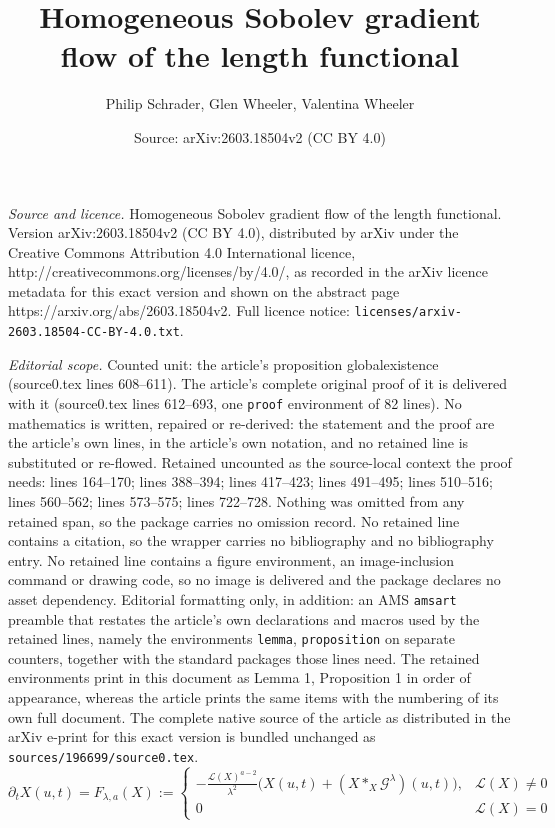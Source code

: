 \documentclass[10pt,a4paper]{amsart}
\title{Homogeneous Sobolev gradient flow of the length functional}
\author{Philip Schrader, Glen Wheeler, Valentina Wheeler}
\date{Source: arXiv:2603.18504v2 (CC BY 4.0)}
\renewcommand{\L}{\length}
\def\length{\mathcal L}
\begin{document}
\maketitle

\noindent\emph{Source and licence.} Homogeneous Sobolev gradient flow of the length functional. Version arXiv:2603.18504v2 (CC BY 4.0), distributed by arXiv under the Creative Commons Attribution 4.0 International licence, http://creativecommons.org/licenses/by/4.0/, as recorded in the arXiv licence metadata for this exact version and shown on the abstract page https://arxiv.org/abs/2603.18504v2. Full licence notice: \texttt{licenses/arxiv-2603.18504-CC-BY-4.0.txt}.\par\smallskip

\noindent\textit{Editorial scope.} Counted unit: the article's proposition globalexistence (source0.tex lines 608--611). The article's complete original proof of it is delivered with it (source0.tex lines 612--693, one \texttt{proof} environment of 82 lines). No mathematics is written, repaired or re-derived: the statement and the proof are the article's own lines, in the article's own notation, and no retained line is substituted or re-flowed.  Retained uncounted as the source-local context the proof needs: lines 164--170; lines 388--394; lines 417--423; lines 491--495; lines 510--516; lines 560--562; lines 573--575; lines 722--728.  Nothing was omitted from any retained span, so the package carries no omission record.  No retained line contains a citation, so the wrapper carries no bibliography and no bibliography entry.  No retained line contains a figure environment, an image-inclusion command or drawing code, so no image is delivered and the package declares no asset dependency.  Editorial formatting only, in addition: an AMS \texttt{amsart} preamble that restates the article's own declarations and macros used by the retained lines, namely the environments \texttt{lemma}, \texttt{proposition} on separate counters, together with the standard packages those lines need.  The retained environments print in this document as Lemma 1, Proposition 1 in order of appearance, whereas the article prints the same items with the numbering of its own full document.  The complete native source of the article as distributed in the arXiv e-print for this exact version is bundled unchanged as \texttt{sources/196699/source0.tex}.
\begin{equation}\label{GF}\tag{GFa}
\partial_t X(u,t)=F_{\lambda,a}(X):= 
\begin{cases}
- \frac{\L(X)^{a-2}}{\lambda^2}\Big(X(u,t)+(X\ast_X \mathcal G^\lambda) (u,t)\Big), & \length(X)\neq 0 \\
0 & \length(X)=0
\end{cases}
\end{equation}
\end{document}
